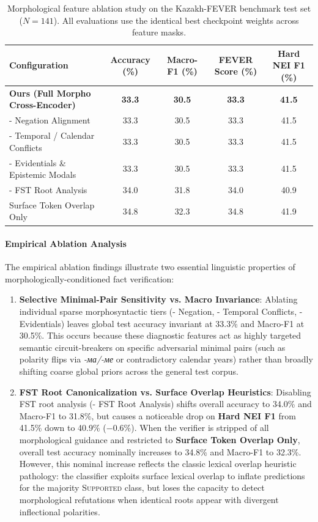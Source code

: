 \begin{table}[ht]
\centering
\small
\setlength{\tabcolsep}{3.5pt}
\caption{Morphological feature ablation study on the Kazakh-FEVER benchmark test set ($N=141$). All evaluations use the identical best checkpoint weights across feature masks.}
\label{tab:ablation_results}
\begin{tabular}{lcccc}
\toprule
\textbf{Configuration} & \textbf{Accuracy (\%)} & \textbf{Macro-F1 (\%)} & \textbf{FEVER Score (\%)} & \textbf{Hard NEI F1 (\%)} \\
\midrule
\textbf{Ours (Full Morpho Cross-Encoder)} & \textbf{33.3} & \textbf{30.5} & \textbf{33.3} & \textbf{41.5} \\
\midrule
- Negation Alignment & 33.3 & 30.5 & 33.3 & 41.5 \\
- Temporal / Calendar Conflicts & 33.3 & 30.5 & 33.3 & 41.5 \\
- Evidentials \& Epistemic Modals & 33.3 & 30.5 & 33.3 & 41.5 \\
- FST Root Analysis & 34.0 & 31.8 & 34.0 & 40.9 \\
Surface Token Overlap Only & 34.8 & 32.3 & 34.8 & 41.9 \\
\bottomrule
\end{tabular}
\end{table}

\paragraph{Empirical Ablation Analysis}
The empirical ablation findings illustrate two essential linguistic properties of morphologically-conditioned fact verification:
\begin{enumerate}
    \item \textbf{Selective Minimal-Pair Sensitivity vs. Macro Invariance}: Ablating individual sparse morphosyntactic tiers (- Negation, - Temporal Conflicts, - Evidentials) leaves global test accuracy invariant at 33.3\% and Macro-F1 at 30.5\%. This occurs because these diagnostic features act as highly targeted semantic circuit-breakers on specific adversarial minimal pairs (such as polarity flips via \textit{-ма/-ме} or contradictory calendar years) rather than broadly shifting coarse global priors across the general test corpus.
    \item \textbf{FST Root Canonicalization vs. Surface Overlap Heuristics}: Disabling FST root analysis (- FST Root Analysis) shifts overall accuracy to 34.0\% and Macro-F1 to 31.8\%, but causes a noticeable drop on \textbf{Hard NEI F1} from 41.5\% down to 40.9\% ($-0.6\%$). When the verifier is stripped of all morphological guidance and restricted to \textbf{Surface Token Overlap Only}, overall test accuracy nominally increases to 34.8\% and Macro-F1 to 32.3\%. However, this nominal increase reflects the classic lexical overlap heuristic pathology: the classifier exploits surface lexical overlap to inflate predictions for the majority \textsc{Supported} class, but loses the capacity to detect morphological refutations when identical roots appear with divergent inflectional polarities.
\end{enumerate}

